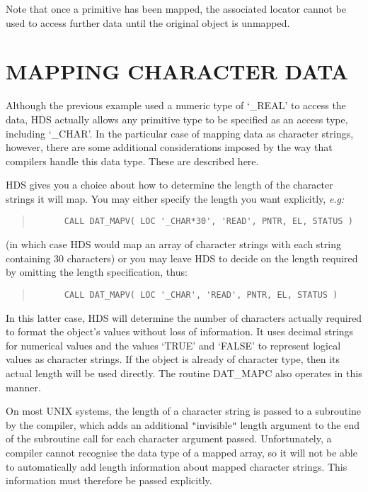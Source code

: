 \documentclass[11pt]{article}
\newcommand{\htmlref}[2]{#1}
\newcommand{\xlabel}[1]{}
\newcommand{\qt}[1]{``#1''}
\newcommand{\st}[1]{{\em{#1}}}
\renewcommand{\qt}[1]{{\tt{"}}#1{\tt{"}}}
\begin{document}
Note that once a primitive has been mapped, the associated
\htmlref{locator}{sect:locators} cannot be used to access further data
until the original object is unmapped.

\section{\xlabel{mapping_character_data}\label{sect:charmapping}MAPPING CHARACTER DATA}

Although the \htmlref{previous example}{example:mapping} used a
numeric \htmlref{type}{sect:type} of `\_REAL' to access the data, HDS
actually allows any primitive type to be specified as an access type,
including `\_CHAR'. In the particular case of mapping data as
character strings, however, there are some additional considerations
imposed by the way that compilers handle this data type. These are
described here.

HDS gives you a choice about how to determine the length of the
character strings it will map. You may either specify the length you
want explicitly, \st{e.g:}

\small
\begin{quote}
\begin{verbatim}
      CALL DAT_MAPV( LOC '_CHAR*30', 'READ', PNTR, EL, STATUS )
\end{verbatim}
\end{quote}
\normalsize

(in which case HDS would map an array of character strings with each
string containing 30 characters) or you may leave HDS to decide on the
length required by omitting the length specification, thus:

\small
\begin{quote}
\begin{verbatim}
      CALL DAT_MAPV( LOC '_CHAR', 'READ', PNTR, EL, STATUS )
\end{verbatim}
\end{quote}
\normalsize

In this latter case, HDS will determine the number of characters
actually required to format the object's values without loss of
information. It uses decimal strings for numerical values and the
values `TRUE' and `FALSE' to represent logical values as character
strings. If the object is already of character type, then its actual
length will be used directly. The routine
\htmlref{DAT\_MAPC}{DAT_MAPx} also operates in this manner.

On most UNIX systems, the length of a character string is passed to a
subroutine by the compiler, which adds an additional \qt{invisible}
length argument to the end of the subroutine call for each character
argument passed. Unfortunately, a compiler cannot recognise the data
type of a mapped array, so it will not be able to automatically add
length information about mapped character strings. This information
must therefore be passed explicitly.
\end{document}
